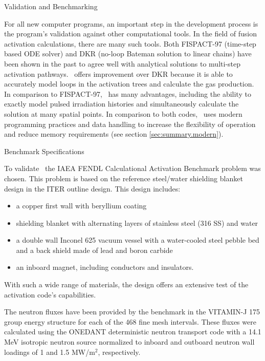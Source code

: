 
\begin{chapter}{Validation and Benchmarking\label{chap:valid}}
  
  For all new computer programs, an important step in the development
  process is the program's validation against other computational
  tools.  In the field of fusion activation calculations, there are
  many such tools.  Both FISPACT-97\cite{FISPACT} (time-step based ODE
  solver) and DKR\cite{DKR} (no-loop Bateman solution to linear
  chains) have been shown in the past to agree well with analytical
  solutions to multi-step activation
  pathways\cite{IAEA.bench2.rep,ITER.exp.valid}.  \ALARA\ offers
  improvement over DKR because it is able to accurately model loops in
  the activation trees and calculate the gas production.  In
  comparison to FISPACT-97, \ALARA\ has many advantages, including the
  ability to exactly model pulsed irradiation histories and
  simultaneously calculate the solution at many spatial points.  In
  comparison to both codes, \ALARA\ uses modern programming practices
  and data handling to increase the flexibility of operation and
  reduce memory requirements (see section \ref{sec:summary.modern}).

  \begin{section}{Benchmark Specifications}
  
    To validate \ALARA\ the IAEA FENDL Calculational Activation
    Benchmark\cite{IAEA.bench1.spec} problem was chosen.  This problem
    is based on the reference steel/water shielding blanket design in
    the ITER outline design.  This design includes:
    \begin{itemize}
    \item a copper first wall with beryllium coating
    \item shielding blanket with alternating layers of stainless steel
      (316 SS) and water
    \item a double wall Inconel 625 vacuum vessel with a water-cooled
      steel pebble bed and a back shield made of lead and boron carbide
    \item an inboard magnet, including conductors and insulators.
    \end{itemize}
    With such a wide range of materials, the design offers an
    extensive test of the activation code's capabilities.
    
    The neutron fluxes have been provided by the benchmark in the
    VITAMIN-J 175 group energy structure for each of the 468 fine mesh
    intervals.  These fluxes were calculated using the
    ONEDANT\cite{ONEDANT} deterministic neutron transport code with a
    14.1 MeV isotropic neutron source normalized to inboard and
    outboard neutron wall loadings of 1 and 1.5 MW/m$^2$,
    respectively.
    

\end{section}
\end{chapter}
